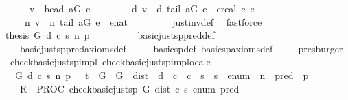 \begin{isabellebody}
\ \ \ \ \ \ v\ {\isacharequal}\ head\ {\isacharquery}aG\ e\ {\isasymand}\ \isanewline
\ \ \ \ \ \ d\ v\ {\isacharequal}\ d\ {\isacharparenleft}tail\ {\isacharquery}aG\ e{\isacharparenright}\ {\isacharplus}\ ereal\ {\isacharparenleft}c\ e{\isacharparenright}\ {\isasymand}\ \isanewline
\ \ \ \ \ n\ v\ {\isacharequal}\ n\ {\isacharparenleft}tail\ {\isacharquery}aG\ e{\isacharparenright}\ {\isacharplus}\ enat\ {}{\isacharparenright}{\isacharparenright}{\isachardoublequoteclose}\isanewline
\ \ \ \ \ \ \isamarkupfalse%
\ just{\isacharunderscore}inv{\isacharunderscore}def\ \isamarkupfalse%
\ fastforce\isanewline
{}\isamarkupfalse%
\isanewline
\ \ \ \isamarkupfalse%
\ {\isachardoublequoteopen}{\isacharquery}thesis\ G\ d\ c\ s\ n\ p{\isachardoublequoteclose}\isanewline
\ \ \ \isamarkupfalse%
\ \isanewline
\ \ \ \ basic{\isacharunderscore}just{\isacharunderscore}sp{\isacharunderscore}pred{\isacharunderscore}def\ \isanewline
\ \ \ \ basic{\isacharunderscore}just{\isacharunderscore}sp{\isacharunderscore}pred{\isacharunderscore}axioms{\isacharunderscore}def\ \isanewline
\ \ \ \ basic{\isacharunderscore}sp{\isacharunderscore}def\ basic{\isacharunderscore}sp{\isacharunderscore}axioms{\isacharunderscore}def\isanewline
\ \ \ \isamarkupfalse%
\ presburger\isanewline
{}\isamarkupfalse%
%
\endisatagproof
{\isafoldproof}%
%
\isadelimproof
\isanewline
%
\endisadelimproof
\isanewline
{}\isamarkupfalse%
\ {\isacharparenleft}\ check{\isacharunderscore}basic{\isacharunderscore}just{\isacharunderscore}sp{\isacharunderscore}impl{\isacharparenright}\ check{\isacharunderscore}basic{\isacharunderscore}just{\isacharunderscore}sp{\isacharunderscore}imp{\isacharunderscore}locale{\isacharcolon}\isanewline
\ \ {\isachardoublequoteopen}{\isasymforall}\ G\ d\ c\ s\ n\ p\ {\isachardot}\ {\isasymGamma}\ {\isasymturnstile}\isactrlsub t\ {\isasymlbrace}\ {\isasymacute}G\ {\isacharequal}\ G\ {\isasymand}\ {\isasymacute}dist\ {\isacharequal}\ d\ {\isasymand}\ {\isasymacute}c\ {\isacharequal}\ c\ {\isasymand}\ {\isasymacute}s\ {\isacharequal}\ s\ {\isasymand}\ {\isasymacute}enum\ {\isacharequal}\ n\ {\isasymand}\ {\isasymacute}pred\ {\isacharequal}\ p\ {\isasymrbrace}\isanewline
\ \ \ \ {\isasymacute}R\ {\isacharcolon}{\isacharequal}{\isacharequal}\ PROC\ check{\isacharunderscore}basic{\isacharunderscore}just{\isacharunderscore}sp\ {\isacharparenleft}{\isasymacute}G{\isacharcomma}\ {\isasymacute}dist{\isacharcomma}\ {\isasymacute}c{\isacharcomma}\ {\isasymacute}s{\isacharcomma}\ {\isasymacute}enum{\isacharcomma}\ {\isasymacute}pred{\isacharparenright}\isanewline

\end{isabellebody}

